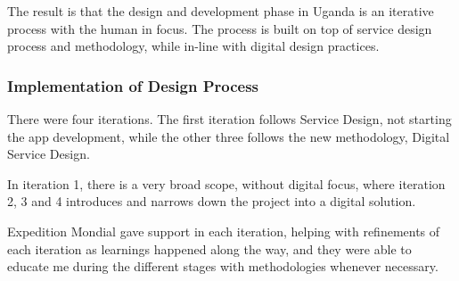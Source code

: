 The result is that the design and development phase in Uganda is an iterative process with the human in focus. The process is built on top of service design process and methodology, while in-line with digital design practices.

\subsubsection{Implementation of Design Process}
There were four iterations. The first iteration follows Service Design, not starting the app development, while the other three follows the new methodology, Digital Service Design.

In iteration 1, there is a very broad scope, without digital focus, where iteration 2, 3 and 4 introduces and narrows down the project into a digital solution.

Expedition Mondial gave support in each iteration, helping with refinements of each iteration as learnings happened along the way, and they were able to educate me during the different stages with methodologies whenever necessary.
